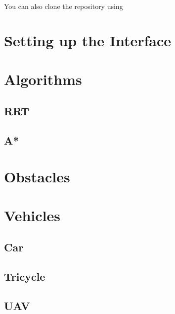 \documentclass[letterpaper,10pt,english]{sphinxmanual}
\begin{document}
\sphinxAtStartPar
You can also clone the repository using 


\section{Setting up the Interface}
\label{\detokenize{interface:setting-up-the-interface}}\label{\detokenize{interface::doc}}

\section{Algorithms}
\label{\detokenize{algorithms:algorithms}}\label{\detokenize{algorithms::doc}}

\subsection{RRT}
\label{\detokenize{algorithms:rrt}}

\subsection{A*}
\label{\detokenize{algorithms:a}}

\section{Obstacles}
\label{\detokenize{obstacles:obstacles}}\label{\detokenize{obstacles::doc}}

\section{Vehicles}
\label{\detokenize{vehicles:vehicles}}\label{\detokenize{vehicles::doc}}

\subsection{Car}
\label{\detokenize{vehicles:car}}

\subsection{Tricycle}
\label{\detokenize{vehicles:tricycle}}

\subsection{UAV}
\label{\detokenize{vehicles:uav}}
\end{document}
